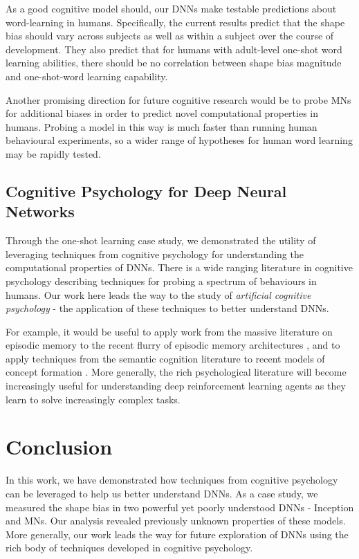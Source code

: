 \documentclass{article}
\begin{document}
As a good cognitive model should, our DNNs make testable predictions about word-learning in humans. Specifically, the current results predict that the shape bias should vary across subjects as well as within a subject over the course of development. They also predict that for humans with adult-level one-shot word learning abilities, there should be no correlation between shape bias magnitude and one-shot-word learning capability.

Another promising direction for future cognitive research would be to probe MNs for additional biases in order to predict novel computational properties in humans. Probing a model in this way is much faster than running human behavioural experiments, so a wider range of hypotheses for human word learning may be rapidly tested.

\subsection{Cognitive Psychology for Deep Neural Networks}
Through the one-shot learning case study, we demonstrated the utility of leveraging techniques from cognitive psychology for understanding the computational properties of DNNs. There is a wide ranging literature in cognitive psychology describing techniques for probing a spectrum of behaviours in humans. Our work here leads the way to the study of \emph{artificial cognitive psychology} - the application of these techniques to better understand DNNs. 

For example, it would be useful to apply work from the massive literature on episodic memory \citep{tulving1985elements} to the recent flurry of episodic memory architectures \citep{blundell2016model,graves2016hybrid}, and to apply techniques from the semantic cognition literature \citep{lamberts2013knowledge} to recent models of concept formation \citep{higgins2016early,gregor2016towards,raposo2017discovering}. More generally, the rich psychological literature will become increasingly useful for understanding deep reinforcement learning agents as they learn to solve increasingly complex tasks.

\section{Conclusion}

In this work, we have demonstrated how techniques from cognitive psychology can be leveraged to help us better understand DNNs. As a case study, we measured the shape bias in two powerful yet poorly understood DNNs - Inception and MNs. Our analysis revealed previously unknown properties of these models. More generally, our work leads the way for future exploration of DNNs using the rich body of techniques developed in cognitive psychology.
\end{document}
